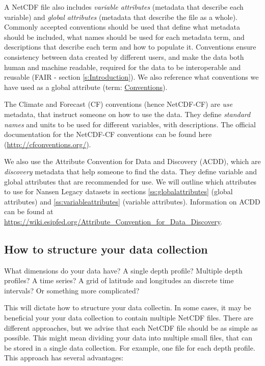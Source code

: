 \documentclass[a4paper,english, 11pt]{article}
\begin{document}
A NetCDF file also includes \textit{variable attributes} (metadata that describe each variable) and \textit{global attributes} (metadata that describe the file as a whole). Commonly accepted conventions should be used that define what metadata should be included,  what names should be used for each metadata term, and descriptions that describe each term and how to populate it. Conventions ensure consistency between data created by different users, and make the data both human and machine readable, required for the data to be interoperable and reusable (FAIR - section \ref{s:Introduction}). We also reference what conventions we have used as a global attribute (term: \href{https://www.unidata.ucar.edu/software/netcdf/conventions.html}{Conventions}). 

The Climate and Forecast (CF) conventions (hence NetCDF-CF) are \textit{use} metadata, that instruct someone on how to use the data. They define \textit{standard names} and units to be used for different variables, with descriptions. The official documentation for the NetCDF-CF conventions can be found here (\url{http://cfconventions.org/}).

We also use the Attribute Convention for Data and Discovery (ACDD), which are \textit{discovery} metadata that help someone to find the data. They define variable and global attributes that are recommended for use. We will outline which attributes to use for Nansen Legacy datasets in sections \ref{ss:globalattributes} (global attributes) and \ref{ss:variableattributes} (variable attributes). Information on ACDD can be found at \url{https://wiki.esipfed.org/Attribute_Convention_for_Data_Discovery}. 

\subsection{How to structure your data collection}
\label{ss:structurecollection}

What dimensions do your data have? A single depth profile? Multiple depth profiles? A time series? A grid of latitude and longitudes an discrete time intervals? Or something more complicated?

This will dictate how to structure your data collectin. In some cases, it may be beneficial your your data collection to contain multiple NetCDF files. There are different approaches, but we advise that each NetCDF file should be as simple as possible. This might mean dividing your data into multiple small files, that can be stored in a single data collection. For example, one file for each depth profile. This approach has several advantages:
\end{document}

